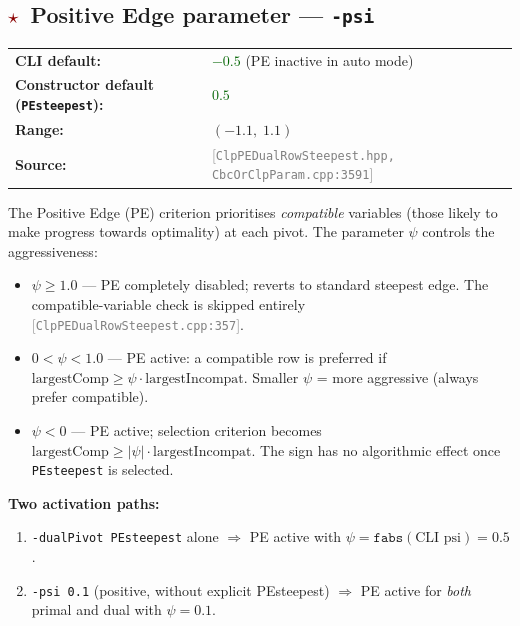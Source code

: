 \documentclass[11pt,a4paper]{article}
\newcommand{\param}[1]{\texttt{\textbf{#1}}}
\newcommand{\val}[1]{\texttt{#1}}
\newcommand{\src}[1]{\textcolor{gray}{\small[\texttt{#1}]}}
\newcommand{\default}[1]{\textcolor{darkgreen}{\texttt{#1}}}
\newcommand{\important}{\textcolor{darkred}{\textbf{$\star$}}}
\begin{document}
\subsection{\important\ Positive Edge parameter --- \param{-psi}}
\label{sec:psi}

\begin{tabular}{@{}ll@{}}
  \textbf{CLI default:} & \default{$-0.5$} (PE inactive in auto mode) \\
  \textbf{Constructor default (\texttt{PEsteepest}):} & \default{$0.5$} \\
  \textbf{Range:}       & $(-1.1,\; 1.1)$ \\
  \textbf{Source:}      & \src{ClpPEDualRowSteepest.hpp, CbcOrClpParam.cpp:3591}
\end{tabular}

\medskip
The Positive Edge (PE) criterion \cite{Towhidi2014} prioritises \emph{compatible}
variables (those likely to make progress towards optimality) at each pivot.
The parameter $\psi$ controls the aggressiveness:

\begin{itemize}[noitemsep]
  \item $\psi \ge 1.0$ --- PE completely disabled; reverts to standard steepest edge.
        The compatible-variable check is skipped entirely
        \src{ClpPEDualRowSteepest.cpp:357}.
  \item $0 < \psi < 1.0$ --- PE active: a compatible row is preferred if
        $\text{largestComp} \ge \psi \cdot \text{largestIncompat}$.
        Smaller $\psi$ = more aggressive (always prefer compatible).
  \item $\psi < 0$ --- PE active; selection criterion becomes
        $\text{largestComp} \ge |\psi| \cdot \text{largestIncompat}$.
        The sign has no algorithmic effect once \val{PEsteepest} is selected.
\end{itemize}

\textbf{Two activation paths:}
\begin{enumerate}[noitemsep]
  \item \texttt{-dualPivot PEsteepest} alone $\Rightarrow$ PE active with
        $\psi = \texttt{fabs}(\text{CLI psi}) = 0.5$.
  \item \texttt{-psi 0.1} (positive, without explicit PEsteepest) $\Rightarrow$
        PE active for \emph{both} primal and dual with $\psi = 0.1$.
\end{enumerate}
\end{document}

